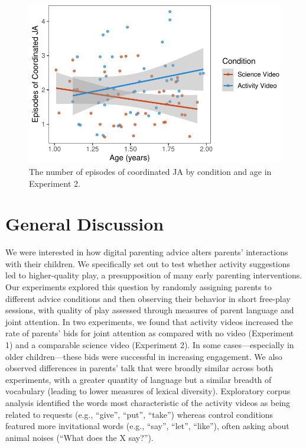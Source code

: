 \documentclass[man,floatsintext]{apa6}
\begin{document}
\begin{figure}[H]

{\centering \includegraphics{figs/e2ja-coord-1} 

}

\caption{The number of episodes of coordinated JA by condition and age in Experiment 2.}\label{fig:e2ja-coord}
\end{figure}

\hypertarget{general-discussion}{%
\section{General Discussion}\label{general-discussion}}

We were interested in how digital parenting advice alters parents' interactions with their children.
We specifically set out to test whether activity suggestions led to higher-quality play, a presupposition of many early parenting interventions.
Our experiments explored this question by randomly assigning parents to different advice conditions and then observing their behavior in short free-play sessions, with quality of play assessed through measures of parent language and joint attention.
In two experiments, we found that activity videos increased the rate of parents' bids for joint attention as compared with no video (Experiment 1) and a comparable science video (Experiment 2).
In some cases---especially in older children---these bids were successful in increasing engagement.
We also observed differences in parents' talk that were broadly similar across both experiments, with a greater quantity of language but a similar breadth of vocabulary (leading to lower measures of lexical diversity).
Exploratory corpus analysis identified the words most characteristic of the activity videos as being related to requests (e.g., \enquote{give}, \enquote{put}, \enquote{take}) whereas control conditions featured more invitational words (e.g., \enquote{say}, \enquote{let}, \enquote{like}), often asking about animal noises (\enquote{What does the X say?}).
\end{document}
